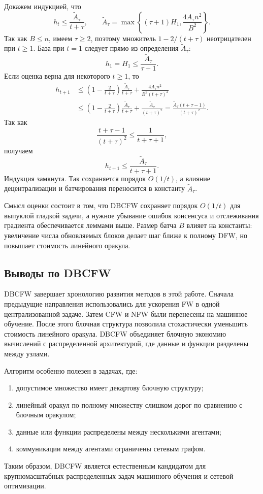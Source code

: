 Докажем индукцией, что
\[
    h_t\leq\frac{\widetilde A_\tau}{t+\tau},
    \qquad
    \widetilde A_\tau
    =
    \max
    \left\{
        (\tau+1)H_1,
        \frac{4A_\tau n^2}{B^2}
    \right\}.
\]
Так как $B\leq n$, имеем $\tau\geq2$, поэтому множитель
$1-2/(t+\tau)$ неотрицателен при $t\geq1$.
База при $t=1$ следует прямо из определения $\widetilde A_\tau$:
\[
    h_1=H_1
    \leq
    \frac{\widetilde A_\tau}{\tau+1}.
\]
Если оценка верна для некоторого $t\geq1$, то
\[
\begin{aligned}
    h_{t+1}
    &\leq
    \left(1-\frac{2}{t+\tau}\right)
    \frac{\widetilde A_\tau}{t+\tau}
    +
    \frac{4A_\tau n^2}{B^2(t+\tau)^2}                                      \\
    &\leq
    \left(1-\frac{2}{t+\tau}\right)
    \frac{\widetilde A_\tau}{t+\tau}
    +
    \frac{\widetilde A_\tau}{(t+\tau)^2}
    =
    \frac{\widetilde A_\tau(t+\tau-1)}{(t+\tau)^2}.
\end{aligned}
\]
Так как
\[
    \frac{t+\tau-1}{(t+\tau)^2}
    \leq
    \frac{1}{t+\tau+1},
\]
получаем
\[
    h_{t+1}\leq\frac{\widetilde A_\tau}{t+\tau+1}.
\]
Индукция замкнута.
Так сохраняется порядок $O(1/t)$, а влияние децентрализации и батчирования переносится
в константу $\widetilde A_\tau$.

Смысл оценки состоит в том, что DBCFW сохраняет порядок $O(1/t)$ для выпуклой гладкой задачи,
а нужное убывание ошибок консенсуса и отслеживания градиента обеспечивается леммами
выше.
Размер батча $B$ влияет на константы: увеличение числа обновляемых блоков делает шаг ближе к полному DFW, но повышает стоимость линейного оракула.



\subsection{Выводы по DBCFW}

DBCFW завершает хронологию развития методов в этой работе.
Сначала предыдущие направления использовались для ускорения FW в одной централизованной задаче.
Затем CFW и NFW были перенесены на машинное обучение.
После этого блочная структура позволила стохастически уменьшить стоимость линейного оракула.
DBCFW объединяет блочную экономию вычислений с распределенной архитектурой, где данные и функции разделены между узлами.

Алгоритм особенно полезен в задачах, где:
\begin{enumerate}
    \item допустимое множество имеет декартову блочную структуру;
    \item линейный оракул по полному множеству слишком дорог по сравнению с блочным оракулом;
    \item данные или функции распределены между несколькими агентами;
    \item коммуникации между агентами ограничены сетевым графом.
\end{enumerate}
Таким образом, DBCFW является естественным кандидатом для крупномасштабных распределенных задач машинного обучения и сетевой оптимизации.
